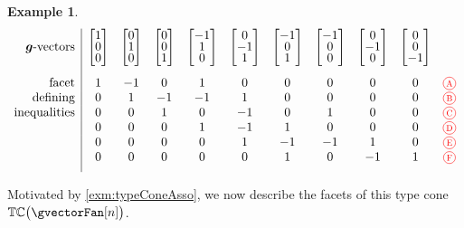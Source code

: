 \documentclass{amsart}
\theoremstyle{definition}
\newtheorem{example}[theorem]{Example}
\renewcommand{\b}[1]{{\boldsymbol{#1}}} %
\newcommand{\red}{\color{red}} %
\newcommand*\circled[1]{\tikz[baseline=(char.base)]{\node[shape=circle, draw, inner sep=1.5pt, scale=.7] (char) {#1};}}
\newcommand{\compactVectorT}[3]{\begin{bmatrix} #1 \\[-.1cm] #2 \\[-.1cm] #3 \end{bmatrix}}
\newcommand{\typeCone}{\mathbb{TC}} %
\begin{document}
\begin{example}
\[\begin{array}{r|cccccccccc}
\text{$\b{g}$-vectors} & \compactVectorT{1}{0}{0} & \compactVectorT{0}{1}{0} & \compactVectorT{0}{0}{1} & \compactVectorT{-1}{1}{0} & \compactVectorT{0}{-1}{1} & \compactVectorT{-1}{0}{1} & \compactVectorT{-1}{0}{0} & \compactVectorT{0}{-1}{0} & \compactVectorT{0}{0}{-1} \\[.6cm]
\text{facet}		& 1 & -1 & 0 & 1 & 0 & 0 & 0 & 0 & 0 & \red \circled{A} \\
\text{defining} 	& 0 & 1 & -1 & -1 & 1 & 0 & 0 & 0 & 0 & \red \circled{B} \\
\text{inequalities}	& 0 & 0 & 1 & 0 & -1 & 0 & 1 & 0 & 0 & \red \circled{C} \\
					& 0 & 0 & 0 & 1 & -1 & 1 & 0 & 0 & 0 & \red \circled{D} \\
					& 0 & 0 & 0 & 0 & 1 & -1 & -1 & 1 & 0 & \red \circled{E} \\
					& 0 & 0 & 0 & 0 & 0 & 1 & 0 & -1 & 1 & \red \circled{F} \\[.2cm]
\end{array}
\]




\end{example}

\pagebreak

Motivated by \cref{exm:typeConeAsso}, we now describe the facets of this type cone~$\typeCone \big( \gvectorFan[n] \big)$.
\end{document}
